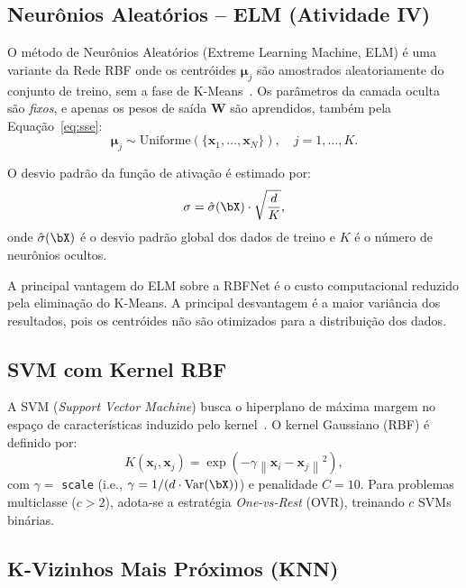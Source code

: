 \documentclass[12pt, a4paper]{article}
\newcommand{\bx}{\mathbf{x}}
\newcommand{\bmu}{\boldsymbol{\mu}}
\newcommand{\bW}{\mathbf{W}}
\newcommand{\norm}[1]{\left\lVert#1\right\rVert}
\begin{document}
\subsection{Neurônios Aleatórios -- ELM (Atividade IV)}
\label{sec:elm}

O método de Neurônios Aleatórios (Extreme Learning Machine, ELM) é uma variante da Rede RBF onde os centróides $\bmu_j$ são amostrados aleatoriamente do conjunto de treino, sem a fase de K-Means~\cite{negri2021}. Os parâmetros da camada oculta são \emph{fixos}, e apenas os pesos de saída $\bW$ são aprendidos, também pela Equação~\eqref{eq:sse}:
\begin{equation}
    \bmu_j \sim \text{Uniforme}(\{\bx_1, \ldots, \bx_N\}), \quad j = 1, \ldots, K.
    \label{eq:elm_centers}
\end{equation}

O desvio padrão da função de ativação é estimado por:
\begin{equation}
    \sigma = \hat{\sigma}(\bX) \cdot \sqrt{\frac{d}{K}},
    \label{eq:elm_sigma}
\end{equation}
onde $\hat{\sigma}(\bX)$ é o desvio padrão global dos dados de treino e $K$ é o número de neurônios ocultos.

A principal vantagem do ELM sobre a RBFNet é o custo computacional reduzido pela eliminação do K-Means. A principal desvantagem é a maior variância dos resultados, pois os centróides não são otimizados para a distribuição dos dados.

\subsection{SVM com Kernel RBF}
\label{sec:svm}

A SVM (\emph{Support Vector Machine}) busca o hiperplano de máxima margem no espaço de características induzido pelo kernel~\cite{bishop2006}. O kernel Gaussiano (RBF) é definido por:
\begin{equation}
    K(\bx_i, \bx_j) = \exp(-\gamma \norm{\bx_i - \bx_j}^2),
    \label{eq:kernel_rbf}
\end{equation}
com $\gamma = $ \texttt{scale} (i.e., $\gamma = 1/(d \cdot \text{Var}(\bX))$) e penalidade $C = 10$. Para problemas multiclasse ($c > 2$), adota-se a estratégia \emph{One-vs-Rest} (OVR), treinando $c$ SVMs binárias.

\subsection{K-Vizinhos Mais Próximos (KNN)}
\label{sec:knn}
\end{document}
